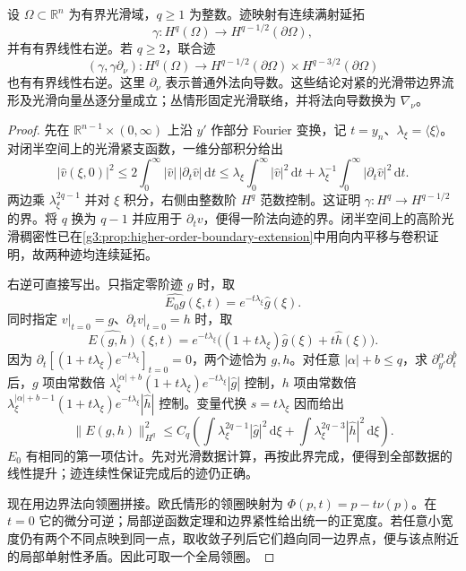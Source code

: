 \begin{theorem}\label{g3:thm:half-integer-boundary-trace}
	设 \(\Omega\subset\mathbb R^n\) 为有界光滑域，\(q\ge1\) 为整数。迹映射有连续满射延拓
	\[
	\gamma:H^q(\Omega)\longrightarrow H^{q-1/2}(\partial\Omega),
	\]
	并有有界线性右逆。若 \(q\ge2\)，联合迹
	\[
	(\gamma,\gamma\partial_\nu):H^q(\Omega)\longrightarrow
	H^{q-1/2}(\partial\Omega)\times H^{q-3/2}(\partial\Omega)
	\]
	也有有界线性右逆。这里 \(\partial_\nu\) 表示普通外法向导数。这些结论对紧的光滑带边界流形及光滑向量丛逐分量成立；丛情形固定光滑联络，并将法向导数换为 \(\nabla_\nu\)。
\end{theorem}
\begin{proof}
	先在 \(\mathbb R^{n-1}\times(0,\infty)\) 上沿 \(y'\) 作部分 Fourier 变换，记 \(t=y_n\)、\(\lambda_\xi=\langle\xi\rangle\)。对闭半空间上的光滑紧支函数，一维分部积分给出
	\[
	|\widehat v(\xi,0)|^2
	\le2\int_0^\infty|\widehat v|\,|\partial_t\widehat v|\,\mathrm dt
	\le\lambda_\xi\int_0^\infty|\widehat v|^2\,\mathrm dt
					+\lambda_\xi^{-1}\int_0^\infty|\partial_t\widehat v|^2\,\mathrm dt.
	\]
	两边乘 \(\lambda_\xi^{2q-1}\) 并对 \(\xi\) 积分，右侧由整数阶 \(H^q\) 范数控制。这证明 \(\gamma:H^q\to H^{q-1/2}\) 的界。将 \(q\) 换为 \(q-1\) 并应用于 \(\partial_tv\)，便得一阶法向迹的界。闭半空间上的高阶光滑稠密性已在\cref{g3:prop:higher-order-boundary-extension}中用向内平移与卷积证明，故两种迹均连续延拓。

	右逆可直接写出。只指定零阶迹 \(g\) 时，取
	\[
	\widehat{E_0g}(\xi,t)=e^{-t\lambda_\xi}\widehat g(\xi).
	\]
	同时指定 \(v|_{t=0}=g\)、\(\partial_tv|_{t=0}=h\) 时，取
	\begin{equation}\label{g3:eq:fourier-boundary-jet-lift}
	\widehat{E(g,h)}(\xi,t)
	=e^{-t\lambda_\xi}
							\bigl((1+t\lambda_\xi)\widehat g(\xi)+t\widehat h(\xi)\bigr).
	\end{equation}
	因为 \(\partial_t[(1+t\lambda_\xi)e^{-t\lambda_\xi}]_{t=0}=0\)，两个迹恰为 \(g,h\)。对任意 \(|\alpha|+b\le q\)，求 \(\partial_{y'}^\alpha\partial_t^b\) 后，\(g\) 项由常数倍
	\(\lambda_\xi^{|\alpha|+b}(1+t\lambda_\xi)e^{-t\lambda_\xi}|\widehat g|\)
	控制，\(h\) 项由常数倍
	\(\lambda_\xi^{|\alpha|+b-1}(1+t\lambda_\xi)e^{-t\lambda_\xi}|\widehat h|\)
	控制。变量代换 \(s=t\lambda_\xi\) 因而给出
	\[
	\|E(g,h)\|_{H^q}^2
	\le C_q\left(
			\int\lambda_\xi^{2q-1}|\widehat g|^2\,\mathrm d\xi+
			\int\lambda_\xi^{2q-3}|\widehat h|^2\,\mathrm d\xi\right).
	\]
	\(E_0\) 有相同的第一项估计。先对光滑数据计算，再按此界完成，便得到全部数据的线性提升；迹连续性保证完成后的迹仍正确。

	现在用边界法向领圈拼接。欧氏情形的领圈映射为
	\(\Phi(p,t)=p-t\nu(p)\)。在 \(t=0\) 它的微分可逆；局部逆函数定理和边界紧性给出统一的正宽度。若任意小宽度仍有两个不同点映到同一点，取收敛子列后它们趋向同一边界点，便与该点附近的局部单射性矛盾。因此可取一个全局领圈。


\end{proof}
